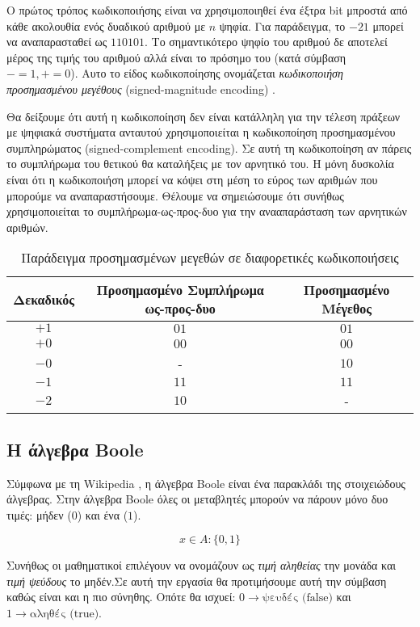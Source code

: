 Ο πρώτος τρόπος κωδικοποιήσης είναι να χρησιμοποιηθεί ένα έξτρα bit μπροστά από κάθε ακολουθία ενός δυαδικού αριθμού με $n$ ψηφία. Για παράδειγμα,
το $-21$ μπορεί να αναπαρασταθεί ως $110101$. Το σημαντικότερο ψηφίο του αριθμού δε αποτελεί μέρος της τιμής του αριθμού αλλά είναι το πρόσημο του
(κατά σύμβαση $- = 1, + = 0$). Αυτο το είδος κωδικοποίησης ονομάζεται \textit{κωδικοποιήση προσημασμένου μεγέθους} (signed-magnitude encoding) \cite{ManoCilleti2018}.

Θα δείξουμε ότι αυτή η κωδικοποίηση δεν είναι κατάλληλη για την τέλεση πράξεων με ψηφιακά συστήματα ανταυτού χρησιμοποιείται η κωδικοποίηση προσημασμένου
συμπληρώματος (signed-complement encoding). Σε αυτή τη κωδικοποίηση αν πάρεις το συμπλήρωμα του θετικού θα καταλήξεις με τον αρνητικό του. Η μόνη δυσκολία είναι ότι
η κωδικοποιήση μπορεί να κόψει στη μέση το εύρος των αριθμών που μπορούμε να αναπαραστήσουμε. Θέλουμε να σημειώσουμε ότι συνήθως χρησιμοποιείται το συμπλήρωμα-ως-προς-δυο
για την ανααπαράσταση των αρνητικών αριθμών.

\begin{table}[ht]
    \centering
    \begin{tabular}{c|c|c}
        Δεκαδικός & Προσημασμένο Συμπλήρωμα ως-προς-δυο & Προσημασμένο Μέγεθος \\
        \hline
        $+1$ & $01$ & $01$ \\
        $+0$ & $00$ & $00$ \\
        $-0$ & -    & $10$ \\
        $-1$ & $11$ & $11$ \\
        $-2$ & $10$ & - \\
    \end{tabular}
    \caption{Παράδειγμα προσημασμένων μεγεθών σε διαφορετικές κωδικοποιήσεις}
\end{table}

\subsection{Η άλγεβρα Boole}

Σύμφωνα με τη Wikipedia \cite{WikipediaBoole2024}, η άλγεβρα Boole είναι ένα παρακλάδι της στοιχειώδους άλγεβρας. Στην άλγεβρα Boole όλες οι μεταβλητές
μπορούν να πάρουν μόνο δυο τιμές: μήδεν ($0$) και ένα ($1$).

\begin{equation}
    x \in A:\{0, 1\}
\end{equation}

Συνήθως οι μαθηματικοί επιλέγουν να ονομάζουν ως \textit{τιμή αληθείας} την μονάδα και \textit{τιμή ψεύδους} το μηδέν.Σε αυτή την εργασία θα προτιμήσουμε αυτή
την σύμβαση καθώς είναι και η πιο σύνηθης. Οπότε θα ισχυεί: $0 \rightarrow \text{ψευδές (false)}$ και $1 \rightarrow \text{αληθές (true)}$.

